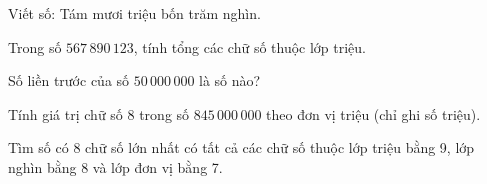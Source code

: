 \begin{ex} %
Viết số: Tám mươi triệu bốn trăm nghìn.
\end{ex}

\begin{ex} %
Trong số $567\,890\,123$, tính tổng các chữ số thuộc lớp triệu.
\end{ex}

\begin{ex} %
Số liền trước của số $50\,000\,000$ là số nào?
\end{ex}

\begin{ex} %
Tính giá trị chữ số 8 trong số $845\,000\,000$ theo đơn vị triệu (chỉ ghi số triệu).
\end{ex}

\begin{ex} %
Tìm số có 8 chữ số lớn nhất có tất cả các chữ số thuộc lớp triệu bằng 9, lớp nghìn bằng 8 và lớp đơn vị bằng 7.
\end{ex}
